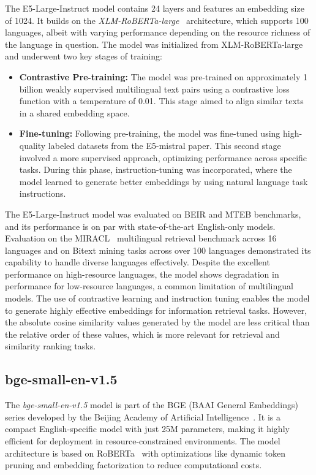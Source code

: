 The E5-Large-Instruct model contains 24 layers and features an embedding size of 1024.
It builds on the \textit{XLM-RoBERTa-large}~\cite{DBLP:journals/corr/abs-1911-02116} architecture, which supports 100 languages, albeit with varying performance depending on the resource richness of the language in question.
The model was initialized from XLM-RoBERTa-large and underwent two key stages of training:
\begin{itemize}
    \item \textbf{Contrastive Pre-training:} The model was pre-trained on approximately 1 billion weakly supervised multilingual text pairs using a contrastive loss function with a temperature of 0.01. This stage aimed to align similar texts in a shared embedding space.
    \item \textbf{Fine-tuning:} Following pre-training, the model was fine-tuned using high-quality labeled datasets from the E5-mistral paper. This second stage involved a more supervised approach, optimizing performance across specific tasks. During this phase, instruction-tuning was incorporated, where the model learned to generate better embeddings by using natural language task instructions.
\end{itemize}
The E5-Large-Instruct model was evaluated on BEIR and MTEB benchmarks, and its performance is on par with state-of-the-art English-only models.
Evaluation on the MIRACL~\cite{zhang-etal-2023-miracl} multilingual retrieval benchmark across 16 languages and on Bitext mining tasks across over 100 languages demonstrated its capability to handle diverse languages effectively.
Despite the excellent performance on high-resource languages, the model shows degradation in performance for low-resource languages, a common limitation of multilingual models.
The use of contrastive learning and instruction tuning enables the model to generate highly effective embeddings for information retrieval tasks.
However, the absolute cosine similarity values generated by the model are less critical than the relative order of these values, which is more relevant for retrieval and similarity ranking tasks.

\subsection{bge-small-en-v1.5}\label{subsec:baai}
The \textit{\textit{bge-small-en-v1.5}} model is part of the BGE (BAAI General Embeddings) series developed by the Beijing Academy of Artificial Intelligence~\cite{bge_embedding}.
It is a compact English-specific model with just 25M parameters, making it highly efficient for deployment in resource-constrained environments.
The model architecture is based on RoBERTa~\cite{liu2019robertarobustlyoptimizedbert} with optimizations like dynamic token pruning and embedding factorization to reduce computational costs.

